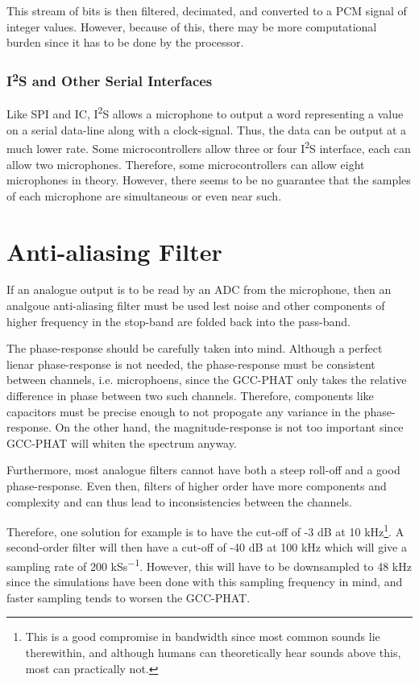 \documentclass[notitlepage]{report}
\begin{document}
This stream of bits is then filtered, decimated, and converted to a PCM signal of integer values. However, because of this, there may be more computational burden since it has to be done by the processor.

\subsubsection{I\textsuperscript{2}S and Other Serial Interfaces}

Like SPI and IC, I\textsuperscript{2}S allows a microphone to output a word representing a value on a serial data-line along with a clock-signal. Thus, the data can be output at a much lower rate. Some microcontrollers allow three or four I\textsuperscript{2}S interface, each can allow two microphones. Therefore, some microcontrollers can allow eight microphones in theory. However, there seems to be no guarantee that the samples of each microphone are simultaneous or even near such.

\section{Anti-aliasing Filter}

If an analogue output is to be read by an ADC from the microphone, then an analgoue anti-aliasing filter must be used lest noise and other components of higher frequency in the stop-band are folded back into the pass-band. 

The phase-response should be carefully taken into mind. Although a perfect lienar phase-response is not needed, the phase-response must be consistent between channels, i.e. microphoens, since the GCC-PHAT only takes the relative difference in phase between two such channels. Therefore, components like capacitors must be precise enough to not propogate any variance in the phase-response. On the other hand, the magnitude-response is not too important since GCC-PHAT will whiten the spectrum anyway.

Furthermore, most analogue filters cannot have both a steep roll-off and a good phase-response. Even then, filters of higher order have more components and complexity and can thus lead to inconsistencies between the channels.

Therefore, one solution for example is to have the cut-off of -3 \si{dB} at 10 \si{kHz}\footnote{This is a good compromise in bandwidth since most common sounds lie therewithin, and although humans can theoretically hear sounds above this, most can practically not.}. A second-order filter will then have a cut-off of -40 \si{dB} at 100 \si{kHz} which will give a sampling rate of 200 \si{kSs^{-1}}. However, this will have to be downsampled to 48 \si{kHz} since the simulations have been done with this sampling frequency in mind, and faster sampling tends to worsen the GCC-PHAT.
\end{document}
